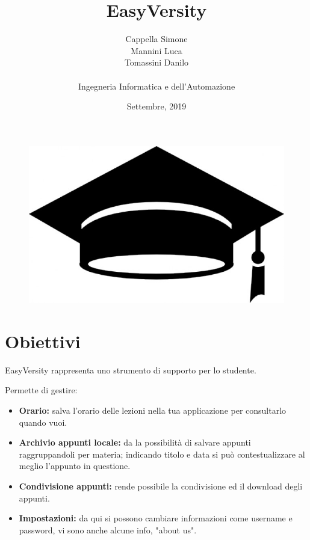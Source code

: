 \documentclass[a4paper, 50pt, twoside]{article}
\begin{document}
\title{EasyVersity}
\date{Settembre, 2019}
\author{Cappella Simone \\ Mannini Luca \\ Tomassini Danilo \\ \\ Ingegneria Informatica e dell'Automazione}
\maketitle
\vspace*{\fill}
\begin{figure}[h!]
	\centering
	\includegraphics[width=\linewidth]{copertina4.jpg}
	\label {fig::copertina}
\end{figure}
\vspace*{\fill}

\newpage
\tableofcontents{}

\newpage
\section{Obiettivi}
EasyVersity rappresenta uno strumento di supporto per lo studente.

Permette di gestire:
\begin{itemize}
\item \textbf{Orario:} salva l'orario delle lezioni nella tua applicazione per consultarlo quando vuoi.
\item \textbf{Archivio appunti locale:} da la possibilità di salvare appunti raggruppandoli per materia; indicando titolo e data si può contestualizzare al meglio l'appunto in questione.
\item \textbf{Condivisione appunti:} rende possibile la condivisione ed il download degli appunti.
\item \textbf{Impostazioni:} da qui si possono cambiare informazioni come username e password, vi sono anche alcune info, "about us".
\end{itemize}
\end{document}

